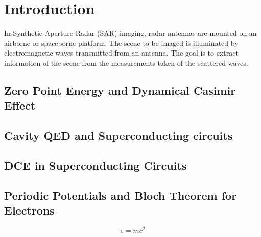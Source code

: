 \chapter{Introduction} %

In Synthetic Aperture Radar (SAR) imaging, radar antennas are mounted on an airborne or spaceborne platform. The scene to be imaged is illuminated by electromagnetic waves transmitted from an antenna. The goal is to extract information of the scene from the measurements taken of the scattered waves.

\section{Zero Point Energy and Dynamical Casimir Effect}
\section{Cavity QED and Superconducting circuits}
\section{DCE in Superconducting Circuits}
\section{Periodic Potentials and Bloch Theorem for Electrons}

\begin{equation} %
	e = mc^{2}
\end{equation}

